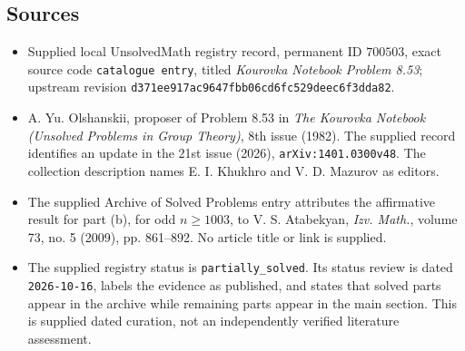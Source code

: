 \documentclass[11pt]{article}
\begin{document}
\subsection{Sources}
\begin{itemize}
\item Supplied local UnsolvedMath registry record, permanent ID \(700503\), exact source code \texttt{catalogue entry}, titled \emph{Kourovka Notebook Problem 8.53}; upstream revision \texttt{d371ee917ac9647fbb06cd6fc529deec6f3dda82}.
\item A. Yu. Olshanskii, proposer of Problem 8.53 in \emph{The Kourovka Notebook (Unsolved Problems in Group Theory)}, 8th issue (1982). The supplied record identifies an update in the 21st issue (2026), \texttt{arXiv:1401.0300v48}. The collection description names E. I. Khukhro and V. D. Mazurov as editors.
\item The supplied Archive of Solved Problems entry attributes the affirmative result for part (b), for odd \(n\geq 1003\), to V. S. Atabekyan, \emph{Izv. Math.}, volume 73, no. 5 (2009), pp. 861--892. No article title or link is supplied.
\item The supplied registry status is \texttt{partially\_solved}. Its status review is dated \texttt{2026-10-16}, labels the evidence as published, and states that solved parts appear in the archive while remaining parts appear in the main section. This is supplied dated curation, not an independently verified literature assessment.
\end{itemize}
\end{document}
